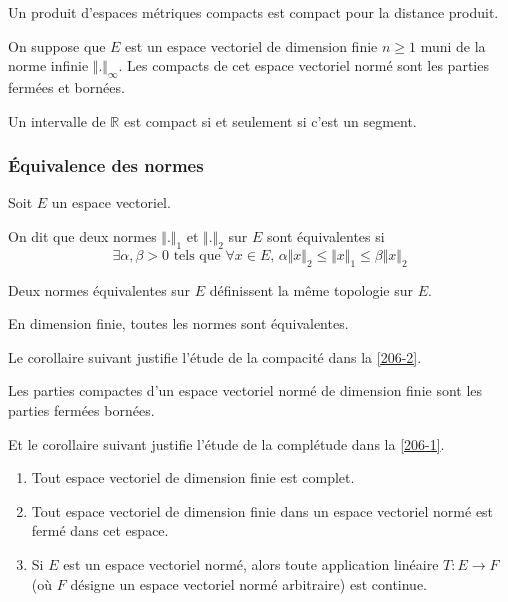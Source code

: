 	\begin{proposition}
		Un produit d'espaces métriques compacts est compact pour la distance produit.
	\end{proposition}
	
	\begin{proposition}
		On suppose que $E$ est un espace vectoriel de dimension finie $n \geq 1$ muni de la norme infinie $\Vert . \Vert_\infty$. Les compacts de cet espace vectoriel normé sont les parties fermées et bornées.
	\end{proposition}
	
	\begin{application}
		Un intervalle de $\mathbb{R}$ est compact si et seulement si c'est un segment.
	\end{application}
	
	\subsubsection{Équivalence des normes}
	
	
	Soit $E$ un espace vectoriel.
	
	\begin{definition}
		On dit que deux normes $\Vert . \Vert_1$ et $\Vert . \Vert_2$ sur $E$ sont équivalentes si
		\[ \exists \alpha, \beta > 0 \text{ tels que } \forall x \in E, \, \alpha \Vert x \Vert_2 \leq \Vert x \Vert_1 \leq \beta \Vert x \Vert_2 \]
	\end{definition}
	
	\begin{remark}
		Deux normes équivalentes sur $E$ définissent la même topologie sur $E$.
	\end{remark}
	
	\begin{theorem}
		En dimension finie, toutes les normes sont équivalentes.
	\end{theorem}
	
	Le corollaire suivant justifie l'étude de la compacité dans la \cref{206-2}.
	
	\begin{corollary}
		Les parties compactes d'un espace vectoriel normé de dimension finie sont les parties fermées bornées.
	\end{corollary}
	
	Et le corollaire suivant justifie l'étude de la complétude dans la \cref{206-1}.
	
	\begin{corollary}
		\begin{enumerate}[label=(\roman*)]
			\item Tout espace vectoriel de dimension finie est complet.
			\item Tout espace vectoriel de dimension finie dans un espace vectoriel normé est fermé dans cet espace.
			\item Si $E$ est un espace vectoriel normé, alors toute application linéaire $T : E \rightarrow F$ (où $F$ désigne un espace vectoriel normé arbitraire) est continue.
		\end{enumerate}
	\end{corollary}
	
